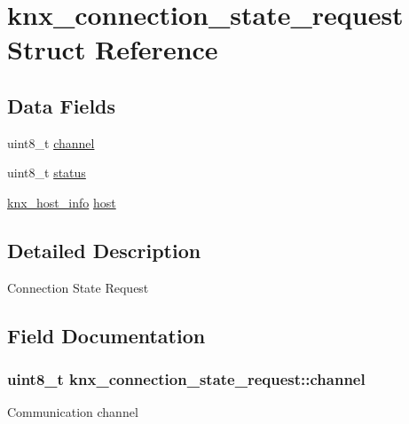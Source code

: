 \hypertarget{structknx__connection__state__request}{}\section{knx\+\_\+connection\+\_\+state\+\_\+request Struct Reference}
\label{structknx__connection__state__request}
\subsection*{Data Fields}
\begin{DoxyCompactItemize}
\item 
uint8\+\_\+t \hyperlink{structknx__connection__state__request_a7bbcb4c0ec46d934153ba0ae9b151762}{channel}
\item 
uint8\+\_\+t \hyperlink{structknx__connection__state__request_a7bfce413c5ccc058ace71e3350360ecf}{status}
\item 
\hyperlink{structknx__host__info}{knx\+\_\+host\+\_\+info} \hyperlink{structknx__connection__state__request_ad0f9ad162a236581ef5f7be4fa236561}{host}
\end{DoxyCompactItemize}


\subsection{Detailed Description}
Connection State Request 

\subsection{Field Documentation}
\subsubsection[{\texorpdfstring{channel}{channel}}]{\setlength{\rightskip}{0pt plus 5cm}uint8\+\_\+t knx\+\_\+connection\+\_\+state\+\_\+request\+::channel}\hypertarget{structknx__connection__state__request_a7bbcb4c0ec46d934153ba0ae9b151762}{}\label{structknx__connection__state__request_a7bbcb4c0ec46d934153ba0ae9b151762}
Communication channel 
